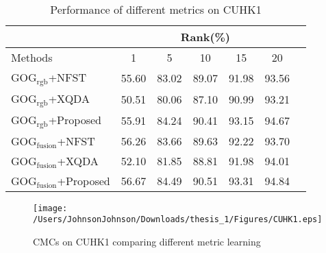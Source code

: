 \begin{table}[H]
\caption{Performance of different metrics on CUHK1}
\centering
\begin{tabular}{|l|c|c|c|c|c|c|}
\hline
& \multicolumn{5}{|c|}{Rank(\%)} \\
\hline
Methods& 1 & 5 &10&15& 20\\
\hline
GOG$_\text{rgb}$+NFST&55.60 &83.02 &89.07 &91.98&93.56 \\ 
\hline
GOG$_\text{rgb}$+XQDA&50.51 &80.06 &87.10 &90.99&93.21 \\ 
\hline
GOG$_\text{rgb}$+Proposed&55.91&84.24&90.41& 93.15&94.67\\  %
\hline
GOG$_\text{fusion}$+NFST&56.26 &83.66 &89.63 &92.22&93.70 \\ 
\hline
GOG$_\text{fusion}$+XQDA&52.10 &81.85&88.81 &91.98&94.01\\ 
\hline
GOG$_\text{fusion}$+Proposed&56.67&84.49& 90.51& 93.31&94.84\\
\hline
\end{tabular}\newline
\end{table}


\begin{figure}[H]
\centering
\texttt{[image: /Users/JohnsonJohnson/Downloads/thesis\_1/Figures/CUHK1.eps]}
\vspace{-3em}
\caption{CMCs on CUHK1 comparing different metric learning}
\end{figure}



